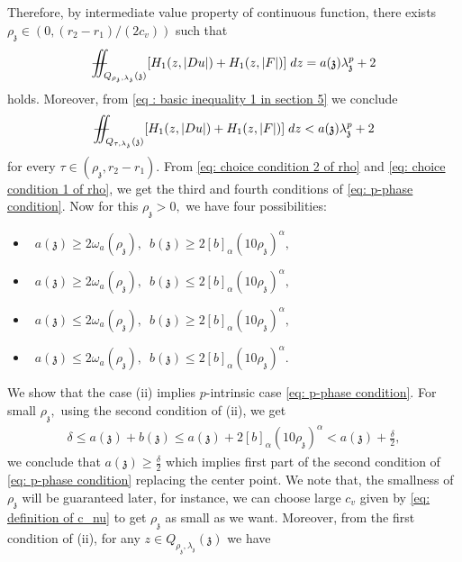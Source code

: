 \documentclass[11pt,oneside, english,reqno,twoside a4paper]{amsart}
\theoremstyle{definition}
\numberwithin{theorem}{section}
\numberwithin{equation}{section}
\newcommand{\mfz}{\mathfrak{z}}
\newcommand{\iintss}{{\int\hspace{-0.28cm}\int}}
\newcommand{ \miints }{{\iintss\hspace{-0.56cm} -\hspace{-0.15cm}-}}
\newcommand{\miint}[1]{{\miints_{\hspace{-0.13cm}#1}}}
\begin{document}
Therefore, by intermediate value property of continuous function, there exists $\rho_\mathfrak{z}\in (0,(r_2-r_1)/(2c_v))$ such that 
\begin{equation}    \label{eq: choice condition 1 of rho}
    \miint{Q_{\rho_\mathfrak{z},\lambda_\mathfrak{z}}(\mathfrak{z})} [H_1(z,|Du|)+H_1(z,|F|)]\; dz=a(\mathfrak{z})\lambda_\mathfrak{z}^p+2
\end{equation}
holds. Moreover, from \eqref{eq : basic inequality 1 in section 5} we conclude
\begin{equation}    \label{eq: choice condition 2 of rho}
    \miint{Q_{\tau,\lambda_\mathfrak{z}}(\mathfrak{z})} [H_1(z,|Du|)+H_1(z,|F|)]\; dz< a(\mathfrak{z})\lambda_\mathfrak{z}^p+2
\end{equation}
for every $\tau\in(\rho_\mathfrak{z},r_2-r_1)$. From \eqref{eq: choice condition 2 of rho} and \eqref{eq: choice condition 1 of rho}, we get the third and fourth conditions of \eqref{eq: p-phase condition}.
Now for this $\rho_{\mfz}>0,$ we have four possibilities:
\begin{itemize}
\item [(i)] $\,\,\,a(\mathfrak{z})\geq 2\omega_a(\rho_{\mathfrak{z}}),\,\,\, b(\mathfrak{z})\geq 2[b]_{\alpha}\left(10 \rho_{\mathfrak{z}}\right)^{\alpha},$\\
\item [(ii)]  $\,\,\, a(\mathfrak{z})\geq 2\omega_a(\rho_{\mathfrak{z}}),\,\,\, b(\mathfrak{z})\leq 2[b]_{\alpha}\left(10 \rho_{\mathfrak{z}}\right)^{\alpha},$\\
\item [(iii)]  $ \,\,\, a(\mathfrak{z})\leq 2\omega_a(\rho_{\mathfrak{z}}),\,\,\, b(\mathfrak{z})\geq 2[b]_{\alpha}\left(10 \rho_{\mathfrak{z}}\right)^{\alpha},$\\
\item [(iv)]  $\,\,\, a(\mathfrak{z})\leq 2\omega_a(\rho_{\mathfrak{z}}),\,\,\, b(\mathfrak{z})\leq 2[b]_{\alpha}\left(10 \rho_{\mathfrak{z}}\right)^{\alpha}.$\\
\end{itemize}
We show that the case (ii) implies $p$-intrinsic case \eqref{eq: p-phase condition}. For small $\rho_{\mathfrak{z}},$ using the second condition of (ii), we get
\begin{align*}
    \delta \leq a(\mathfrak{z})+b(\mathfrak{z})\leq a(\mathfrak{z})+2[b]_{\alpha}(10 \rho_{\mathfrak{z}})^{\alpha}<a(\mathfrak{z})+\frac{\delta}{2},
\end{align*}
we conclude that $a(\mathfrak{z})\geq \frac{\delta}{2}$ which implies first part of the second condition of \eqref{eq: p-phase condition} replacing the center point. We note that, the smallness of  $\rho_{\mathfrak{z}}$ will be guaranteed later, for instance, we can choose large $c_v$ given by \eqref{eq: definition of c_nu} to get $\rho_{\mathfrak{z}}$ as small as we want. Moreover, from the first condition of (ii), for any $z \in Q_{\rho_{\mathfrak{z}}, \lambda_{\mathfrak{z}}}(\mathfrak{z})$ we have
\end{document}
